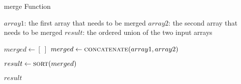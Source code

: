         \begin{frame}[containsverbatim]{\mergefunctionframe}
            \vspace{-0.2cm}
            \begingroup
                \makeatletter
                \renewcommand{\alglinenumber}[1]{\small#1}
                \makeatother
                \begin{algorithm}[H]
                    \small
                    \caption{merge Function} \label{merge function}
                    \begin{algorithmic}[1]
                        \Require 
                            \Statex $array1$: the first array that needs to be merged
                            \Statex $array2$: the second array that needs to be merged
                        \Ensure
                            \Statex $result$: the ordered union of the two input arrays
                        \Statex
        
                            \State $merged \gets \left[\ \right]$
                            \State $merged \gets \Call{concatenate}{array1, array2}$
        
                            \State $result \gets \Call{sort}{merged}$ 
        
                            \State \Return $result$
                        \EndFunction
                    \end{algorithmic}
                \end{algorithm}
            \endgroup
        \end{frame}

